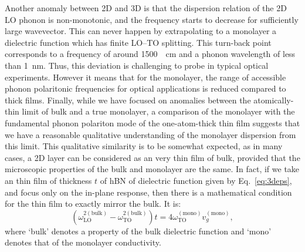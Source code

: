 \documentclass[aps,prb,twocolumn,
	           groupedaddress,superscriptaddress,
               amsfonts,amssymb,amsmath,floatfix,
	           citeautoscript]{revtex4-1}
\begin{document}
Another anomaly between 2D and 3D is that the dispersion relation of the 2D LO phonon is non-monotonic, and the frequency starts to decrease for sufficiently large wavevector. This can never happen by extrapolating to a monolayer a dielectric function which has finite LO--TO splitting. This turn-back point corresponds to a frequency of around \SI{1500}{\per\cm} and a phonon wavelength of less than \SI{1}{\nm}. Thus, this deviation is challenging to probe in typical optical experiments. However it means that for the monolayer, the range of accessible phonon polaritonic frequencies for optical applications is reduced compared to thick films. Finally, while we have focused on anomalies between the atomically-thin limit of bulk and a true monolayer, a comparison of the monolayer with the fundamental phonon polariton mode of the one-atom-thick thin film suggests that we have a reasonable qualitative understanding of the monolayer dispersion from this limit. This qualitative similarity is to be somewhat expected, as in many cases, a 2D layer can be considered as an very thin film of bulk, provided that the microscopic properties of the bulk and monolayer are the same. In fact, if we take an thin film of thickness $t$ of hBN of dielectric function given by Eq.~\eqref{eq:3deps}, and focus only on the in-plane response, then there is a mathematical condition for the thin film to exactly mirror the bulk. It is: 
\begin{equation}
(\omega^{2 (\mathrm{bulk})}_{\mathrm{LO}} - \omega^{2 (\mathrm{bulk})}_{\mathrm{TO}})t = 4\omega^{(\mathrm{mono})}_{\mathrm{TO}}v^{(\mathrm{mono})}_g,
\end{equation}
where `bulk' denotes a property of the bulk dielectric function and `mono' denotes that of the monolayer conductivity.

\end{document}
